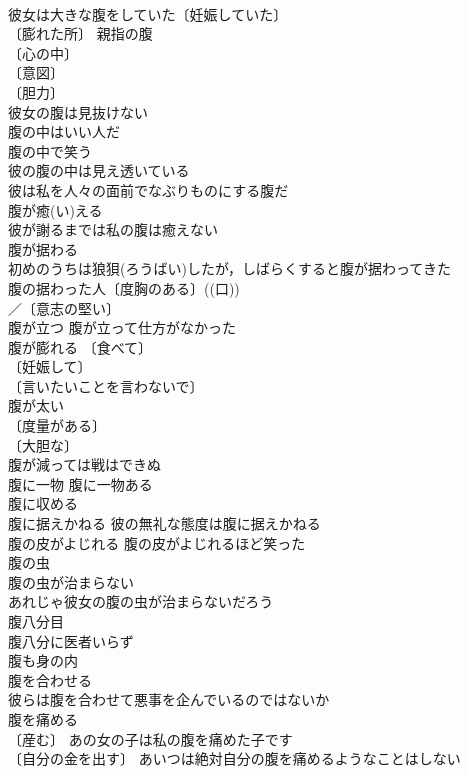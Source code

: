 \documentclass[8pt]{extreport}
\begin{document}
\begin{CJK}{UTF8}{min}
\\	彼女は大きな腹をしていた〔妊娠していた〕 
\\	〔膨れた所〕 親指の腹 
\\	〔心の中〕
\\	〔意図〕
\\	〔胆力〕
\\	彼女の腹は見抜けない 
\\	腹の中はいい人だ 
\\	腹の中で笑う 
\\	彼の腹の中は見え透いている 
\\	彼は私を人々の面前でなぶりものにする腹だ 
\\	腹が癒(い)える　
\\	彼が謝るまでは私の腹は癒えない 
\\	腹が据わる　
\\	初めのうちは狼狽(ろうばい)したが，しばらくすると腹が据わってきた 
\\	腹の据わった人〔度胸のある〕((口)) 
\\	／〔意志の堅い〕 
\\	腹が立つ 腹が立って仕方がなかった 
\\	腹が膨れる 〔食べて〕
\\	〔妊娠して〕
\\	〔言いたいことを言わないで〕
\\	腹が太い 
\\	〔度量がある〕
\\	〔大胆な〕
\\	腹が減っては戦はできぬ 
\\	腹に一物 腹に一物ある 
\\	腹に収める 
\\	腹に据えかねる 彼の無礼な態度は腹に据えかねる 
\\	腹の皮がよじれる 腹の皮がよじれるほど笑った 
\\	腹の虫　
\\	腹の虫が治まらない 
\\	あれじゃ彼女の腹の虫が治まらないだろう 
\\	腹八分目　
\\	腹八分に医者いらず 
\\	腹も身の内 
\\	腹を合わせる　
\\	彼らは腹を合わせて悪事を企んでいるのではないか 
\\	腹を痛める 
\\	〔産む〕 あの女の子は私の腹を痛めた子です 
\\	〔自分の金を出す〕 あいつは絶対自分の腹を痛めるようなことはしない 

\end{CJK}
\end{document}

